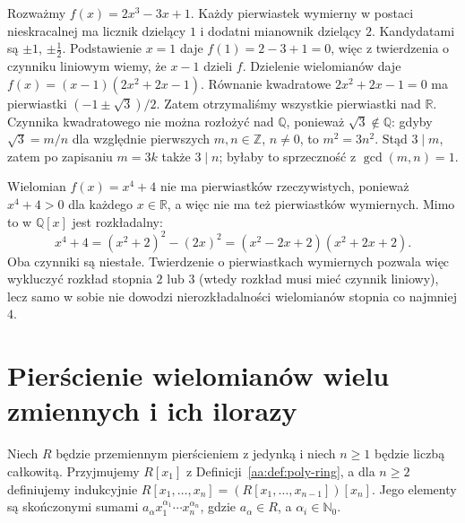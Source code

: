 \begin{przyklad}
\label{aa:prz:rational-root-cubic}
Rozważmy $f(x)=2x^3-3x+1$. Każdy pierwiastek wymierny
w postaci nieskracalnej ma licznik dzielący $1$
i dodatni mianownik dzielący $2$. Kandydatami są
$\pm1$, $\pm\tfrac12$. Podstawienie $x=1$ daje
$f(1)=2-3+1=0$, więc z twierdzenia o czynniku liniowym
wiemy, że $x-1$ dzieli $f$.
Dzielenie wielomianów daje
$f(x)=(x-1)(2x^2+2x-1)$.
Równanie kwadratowe $2x^2+2x-1=0$ ma pierwiastki
$(-1\pm\sqrt3)/2$. Zatem otrzymaliśmy wszystkie
pierwiastki nad $\mathbb R$. Czynnika kwadratowego
nie można rozłożyć nad $\mathbb Q$, ponieważ
$\sqrt3\notin\mathbb Q$: gdyby $\sqrt3=m/n$
dla względnie pierwszych $m,n\in\mathbb Z$, $n\ne0$,
to $m^2=3n^2$. Stąd $3\mid m$, zatem po zapisaniu
$m=3k$ także $3\mid n$; byłaby to sprzeczność
z $\gcd(m,n)=1$.
\end{przyklad}

\begin{przyklad}
\label{aa:prz:rational-root-insufficient}
Wielomian $f(x)=x^4+4$ nie ma pierwiastków rzeczywistych,
ponieważ $x^4+4>0$ dla każdego $x\in\mathbb R$,
a więc nie ma też pierwiastków wymiernych.
Mimo to w $\mathbb Q[x]$ jest rozkładalny:
\[
 x^4+4=(x^2+2)^2-(2x)^2
       =(x^2-2x+2)(x^2+2x+2).
\]
Oba czynniki są niestałe. Twierdzenie o pierwiastkach
wymiernych pozwala więc wykluczyć rozkład stopnia $2$
lub $3$ (wtedy rozkład musi mieć czynnik liniowy),
lecz samo w sobie nie dowodzi nierozkładalności
wielomianów stopnia co najmniej $4$.
\end{przyklad}

\section{Pierścienie wielomianów wielu zmiennych i ich ilorazy}
\begin{definicja}
\label{aa:def:multi-polynomial}
Niech $R$ będzie przemiennym pierścieniem z jedynką
i niech $n\ge1$ będzie liczbą całkowitą.
Przyjmujemy $R[x_1]$ z Definicji~\ref{aa:def:poly-ring},
a dla $n\ge2$ definiujemy indukcyjnie
$R[x_1,\ldots,x_n]=(R[x_1,\ldots,x_{n-1}])[x_n]$.
Jego elementy są skończonymi sumami
$a_{\alpha}x_1^{\alpha_1}\cdots x_n^{\alpha_n}$,
gdzie $a_{\alpha}\in R$, a $\alpha_i\in\mathbb N_0$.
\end{definicja}


